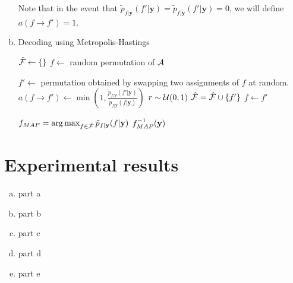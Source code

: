 \documentclass{siamart190516}
\begin{document}
\begin{enumerate}[(a)]
        Note that in the event that $\tilde{p}_{f | \textbf{y}}(f' | \textbf{y}) = \tilde{p}_{f | \textbf{y}}(f' | \textbf{y}) = 0$, we will define $a(f \rightarrow f') = 1$.

  \item
        \begin{algorithm*}
          \caption{Decoding using Metropolis-Hastings}
          \label{alg:decoding}
          \begin{algorithmic}
            \STATE $\hat{\mathcal{F}} \leftarrow \{\}$
            \STATE $f \leftarrow$ random permutation of $\mathcal{A}$

            \STATE $f' \leftarrow$ permutation obtained by swapping two assignments of $f$ at random.
            \STATE $a(f \rightarrow f') \leftarrow \min(1, \frac{\tilde{p}_{f | \textbf{y}}(f' | \textbf{y})}{\tilde{p}_{f | \textbf{y}}(f | \textbf{y})})$
            \STATE $r \sim \mathcal{U}(0, 1)$
            \STATE $\hat{\mathcal{F}} = \hat{\mathcal{F}} \cup \{ f' \}$
            \STATE $f \leftarrow f'$
            \ENDIF
            \ENDWHILE

            \STATE $f_{MAP} = \operatorname*{arg\,max}_{f \in \hat{\mathcal{F}}} \tilde{{p}}_{f | \textbf{y}}(f | \textbf{y})$
            \RETURN $f_{MAP}^{-1}(\textbf{y})$
          \end{algorithmic}
        \end{algorithm*}
\end{enumerate}

\section{Experimental results}
\label{sec:experiments}

\begin{enumerate}[(a)]
  \item part a
  \item part b
  \item part c
  \item part d
  \item part e
\end{enumerate}
\end{document}

